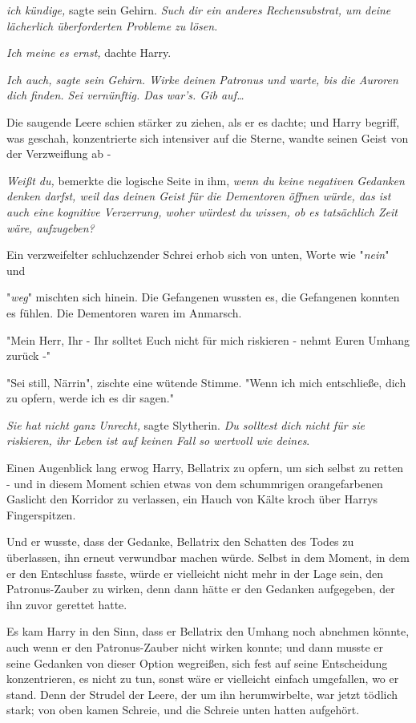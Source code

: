 {\emph{ich kündige,} sagte sein Gehirn. \emph{Such dir ein anderes Rechensubstrat, um deine lächerlich überforderten Probleme zu lösen.}

\emph{Ich meine es ernst,} dachte Harry.

\emph{Ich auch, sagte sein Gehirn. Wirke deinen Patronus und warte, bis die Auroren dich finden. Sei vernünftig. Das war's. Gib auf…}

Die saugende Leere schien stärker zu ziehen, als er es dachte; und Harry begriff, was geschah, konzentrierte sich intensiver auf die Sterne, wandte seinen Geist von der Verzweiflung ab -

\emph{Weißt du,} bemerkte die logische Seite in ihm, \emph{wenn du keine negativen Gedanken denken darfst, weil das deinen Geist für die Dementoren öffnen würde, das ist auch eine kognitive Verzerrung, woher würdest du wissen, ob es tatsächlich Zeit wäre, aufzugeben?}

Ein verzweifelter schluchzender Schrei erhob sich von unten, Worte wie "\emph{nein}" und

"\emph{weg}" mischten sich hinein. Die Gefangenen wussten es, die Gefangenen konnten es fühlen. Die Dementoren waren im Anmarsch.

"Mein Herr, Ihr - Ihr solltet Euch nicht für mich riskieren - nehmt Euren Umhang zurück -"

"Sei still, Närrin", zischte eine wütende Stimme. "Wenn ich mich entschließe, dich zu opfern, werde ich es dir sagen."

\emph{Sie hat nicht ganz Unrecht,} sagte Slytherin. \emph{Du solltest dich nicht für sie riskieren, ihr Leben ist auf keinen Fall so wertvoll wie deines}.

Einen Augenblick lang erwog Harry, Bellatrix zu opfern, um sich selbst zu retten - und in diesem Moment schien etwas von dem schummrigen orangefarbenen Gaslicht den Korridor zu verlassen, ein Hauch von Kälte kroch über Harrys Fingerspitzen.

Und er wusste, dass der Gedanke, Bellatrix den Schatten des Todes zu überlassen, ihn erneut verwundbar machen würde. Selbst in dem Moment, in dem er den Entschluss fasste, würde er vielleicht nicht mehr in der Lage sein, den Patronus-Zauber zu wirken, denn dann hätte er den Gedanken aufgegeben, der ihn zuvor gerettet hatte.

Es kam Harry in den Sinn, dass er Bellatrix den Umhang noch abnehmen könnte, auch wenn er den Patronus-Zauber nicht wirken konnte; und dann musste er seine Gedanken von dieser Option wegreißen, sich fest auf seine Entscheidung konzentrieren, es nicht zu tun, sonst wäre er vielleicht einfach umgefallen, wo er stand. Denn der Strudel der Leere, der um ihn herumwirbelte, war jetzt tödlich stark; von oben kamen Schreie, und die Schreie unten hatten aufgehört.

}

